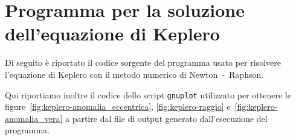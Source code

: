 \chapter{Programma per la soluzione dell'equazione di Keplero}
\label{cha:soluzione-keplero}

Di seguito è riportato il codice sorgente del programma usato per risolvere
l'equazione di Keplero con il metodo numerico di Newton~-~Raphson.
% 

Qui riportiamo inoltre il codice dello script \verb|gnuplot| utilizzato per
ottenere le figure~\ref{fig:keplero-anomalia_eccentrica},
\ref{fig:keplero-raggio} e~\ref{fig:keplero-anomalia_vera} a partire dal file di
output generato dall'esecuzione del programma.


